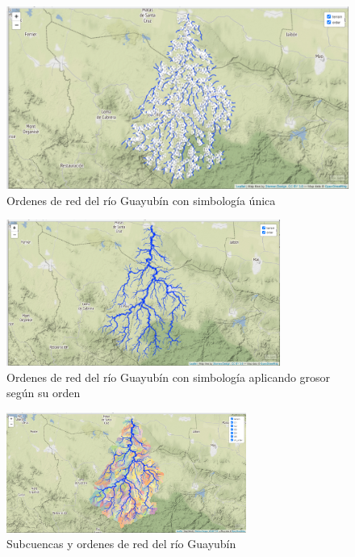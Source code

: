 \documentclass[11pt,]{article}
\begin{document}
\begin{figure}
\centering
\includegraphics[width=1.00000\textwidth]{ordenes de red.png}
\caption{Ordenes de red del río Guayubín con simbología
única\label{unica}}
\end{figure}

\begin{figure}
\centering
\includegraphics[width=0.80000\textwidth]{orden de red mapa 2.png}
\caption{Ordenes de red del río Guayubín con simbología aplicando grosor
según su orden\label{grosor}}
\end{figure}

\begin{figure}
\centering
\includegraphics[width=0.70000\textwidth]{cuencas delimitadas y ordenes de red.png}
\caption{Subcuencas y ordenes de red del río Guayubín\label{subcuencas}}
\end{figure}
\end{document}

